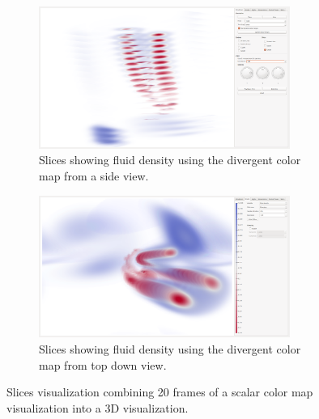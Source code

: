 \begin{figure}[tbh]
	\centering
	\begin{subfigure}{0.45\textwidth}
		\centering
		\includegraphics[width=0.9\textwidth, trim={35px 30px 430px 30px}, clip]{img/slices/diverging_sides}
		\caption{Slices showing fluid density using the divergent color map from a side view.}
		\label{fig:slices:colormap:side}
	\end{subfigure}
	\hspace{30px}
	\begin{subfigure}{0.45\textwidth}	
		\centering
		\includegraphics[width=0.9\textwidth, trim={35px 30px 430px 30px}, clip]{img/slices/divering}
		\caption{Slices showing fluid density using the divergent color map from top down view.}
		\label{fig:slices:colormap:top}
	\end{subfigure}
	\caption{Slices visualization combining 20 frames of a scalar color map visualization into a 3D visualization.}
	\label{fig:slices:colormap}
\end{figure}


